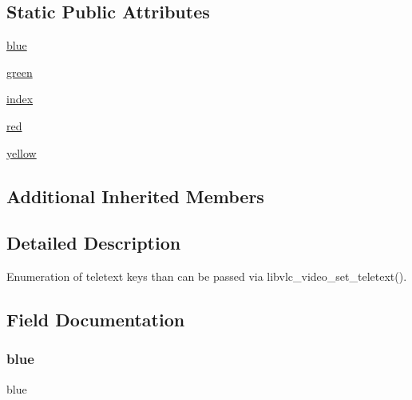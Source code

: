\subsection*{Static Public Attributes}
\begin{DoxyCompactItemize}
\item 
\hyperlink{classvlc_1_1_teletext_key_aa6074166cc77c18081343a82d3af99bf}{blue}
\item 
\hyperlink{classvlc_1_1_teletext_key_ad83fb941855ba7c4aa2bb65245437777}{green}
\item 
\hyperlink{classvlc_1_1_teletext_key_a6784e1c334dfceb8f017667c0b0f6a3e}{index}
\item 
\hyperlink{classvlc_1_1_teletext_key_a42c3a4a0281e61ee592e36a3eda020f2}{red}
\item 
\hyperlink{classvlc_1_1_teletext_key_ad3499d1fde70bb924b0201cc8faa598d}{yellow}
\end{DoxyCompactItemize}
\subsection*{Additional Inherited Members}


\subsection{Detailed Description}
\begin{DoxyVerb}Enumeration of teletext keys than can be passed via
libvlc_video_set_teletext().
\end{DoxyVerb}
 

\subsection{Field Documentation}
\mbox{\label{classvlc_1_1_teletext_key_aa6074166cc77c18081343a82d3af99bf}} 
\subsubsection{\texorpdfstring{blue}{blue}}
{\footnotesize\ttfamily blue\hspace{0.3cm}{\ttfamily [static]}}

\mbox{\label{classvlc_1_1_teletext_key_ad83fb941855ba7c4aa2bb65245437777}} 
